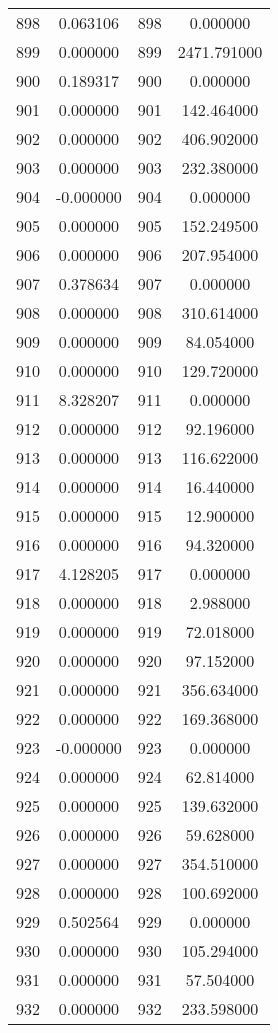 \documentclass[12pt]{article}
\begin{document}
\begin{longtable}{@{}cccc@{}}
898 & 0.063106 & 898 & 0.000000 \\
899 & 0.000000 & 899 & 2471.791000 \\
900 & 0.189317 & 900 & 0.000000 \\
901 & 0.000000 & 901 & 142.464000 \\
902 & 0.000000 & 902 & 406.902000 \\
903 & 0.000000 & 903 & 232.380000 \\
904 & -0.000000 & 904 & 0.000000 \\
905 & 0.000000 & 905 & 152.249500 \\
906 & 0.000000 & 906 & 207.954000 \\
907 & 0.378634 & 907 & 0.000000 \\
908 & 0.000000 & 908 & 310.614000 \\
909 & 0.000000 & 909 & 84.054000 \\
910 & 0.000000 & 910 & 129.720000 \\
911 & 8.328207 & 911 & 0.000000 \\
912 & 0.000000 & 912 & 92.196000 \\
913 & 0.000000 & 913 & 116.622000 \\
914 & 0.000000 & 914 & 16.440000 \\
915 & 0.000000 & 915 & 12.900000 \\
916 & 0.000000 & 916 & 94.320000 \\
917 & 4.128205 & 917 & 0.000000 \\
918 & 0.000000 & 918 & 2.988000 \\
919 & 0.000000 & 919 & 72.018000 \\
920 & 0.000000 & 920 & 97.152000 \\
921 & 0.000000 & 921 & 356.634000 \\
922 & 0.000000 & 922 & 169.368000 \\
923 & -0.000000 & 923 & 0.000000 \\
924 & 0.000000 & 924 & 62.814000 \\
925 & 0.000000 & 925 & 139.632000 \\
926 & 0.000000 & 926 & 59.628000 \\
927 & 0.000000 & 927 & 354.510000 \\
928 & 0.000000 & 928 & 100.692000 \\
929 & 0.502564 & 929 & 0.000000 \\
930 & 0.000000 & 930 & 105.294000 \\
931 & 0.000000 & 931 & 57.504000 \\
932 & 0.000000 & 932 & 233.598000 \\

\end{longtable}
\end{document}
